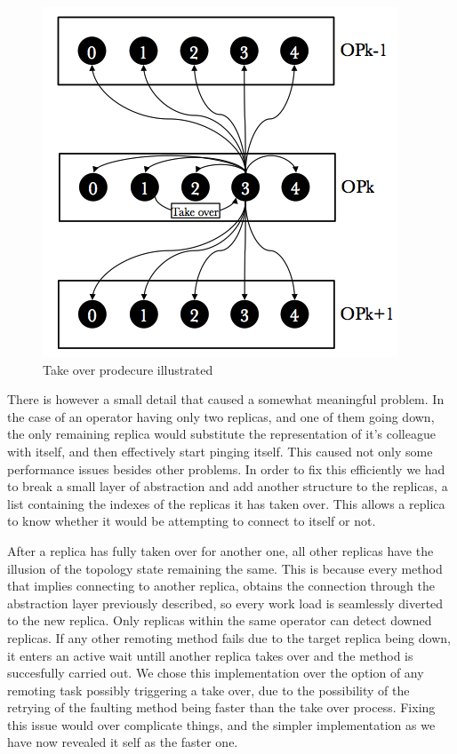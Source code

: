 \documentclass[times, 10pt,twocolumn]{article}
\begin{document}
\begin{figure}[h] 
	\includegraphics[width=\columnwidth]{take_over}
	\caption{Take over prodecure illustrated}
\end{figure}

There is however a small detail that caused a somewhat meaningful problem. In the case of an operator having only two replicas, and one of them going down, the only remaining replica would substitute the representation of it's colleague with itself, and then effectively start pinging itself. This caused not only some performance issues besides other problems.
In order to fix this efficiently we had to break a small layer of abstraction and add another structure to the replicas, a list containing the indexes of the replicas it has taken over. This allows a replica to know whether it would be attempting to connect to itself or not.

After a replica has fully taken over for another one, all other replicas have the illusion of the topology state remaining the same. This is because every method that implies connecting to another replica, obtains the connection through the abstraction layer previously described, so every work load is seamlessly diverted to the new replica.
Only replicas within the same operator can detect downed replicas. If any other remoting method fails due to the target replica being down, it enters an active wait untill another replica takes over and the method is succesfully carried out. We chose this implementation over the option of any remoting task possibly triggering a take over, due to the possibility of the retrying of the faulting method being faster than the take over process. Fixing this issue would over complicate things, and the simpler implementation as we have now revealed it self as the faster one.
\end{document}
